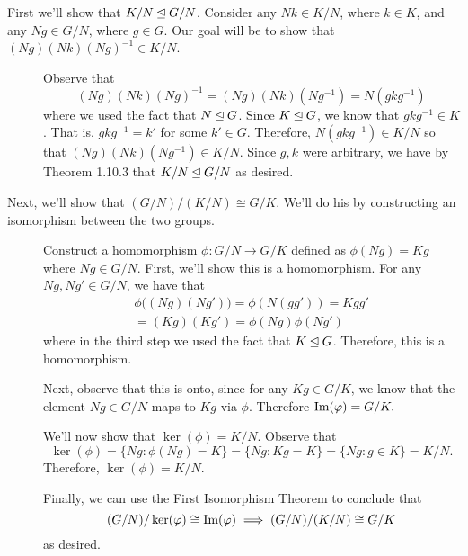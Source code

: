     \begin{prf}
        \textcolor{NavyBlue}{First we'll show that $K/N \unlhd G/N$. Consider any $Nk \in
        K/N$, where $k \in K$, and any $Ng \in G/N$, where $g \in G$.
        Our goal will be to show that $(Ng)(Nk)(Ng)^{-1} \in K/N$.}

        \begin{description}
            \item[\phantom{1}]
            \hspace{0.5cm} Observe that 
            \[
                (Ng)(Nk)(Ng)^{-1} = (Ng)(Nk)(Ng^{-1}) = N(gkg^{-1})
            \]  
            where we used the fact that $N \unlhd G$.  
            Since $K \unlhd G$, we know that $gkg^{-1} \in K$. That is,
            $gkg^{-1} = k'$ for some $k' \in G$. Therefore, $N(gkg^{-1})
            \in K/N$ so that $(Ng)(Nk)(Ng^{-1}) \in K/N$. Since $g, k$
            were arbitrary, we have by Theorem
            1.10.3 that $K/N \unlhd G/N$ as desired.
            
        \end{description}

        \textcolor{NavyBlue}{Next, we'll show that $(G/N)/(K/N) \cong
        G/K$. We'll do his by constructing an isomorphism between the
        two groups.}
        \begin{description}
            \item[\phantom{1}]
            \hspace{0.5cm}  Construct a
            homomorphism $\phi: G/N \to G/K$ defined as $\phi(Ng) = Kg$ where $Ng \in
            G/N$. First, we'll show this is a homomorphism. For any $Ng,
            Ng' \in G/N$, we have that 
            \begin{align*}
                \phi\big((Ng)(Ng')\big) = \phi(N(gg')) = Kgg' \\
                = (Kg)(Kg') = \phi(Ng)\phi(Ng')
            \end{align*}
            where in the third step we used the fact that $K \unlhd G$.
            Therefore, this is a homomorphism. 
    
            Next, observe that this is onto, since for any $Kg \in G/K$,
            we know that the element $Ng \in G/N$ maps to $Kg$ via $\phi$.
            Therefore $\mbox{Im}(\varphi) = G/K.$
    
            We'll now show that $\ker(\phi) = K/N$. 
            Observe that 
            \[
                \ker(\phi) = \{Ng: \phi(Ng) = K\} = \{Ng: Kg = K\} = \{Ng: g \in K\} = K/N.
            \]
            Therefore, $\ker(\phi) = K/N$.
    
            Finally, we can use the First Isomorphism Theorem to conclude
            that 
            \[
                (G/N)/\ker(\varphi) \cong \mbox{Im}(\varphi) \implies (G/N)/(K/N) \cong G/K
            \]
            as desired.            
        \end{description}

    \end{prf}

